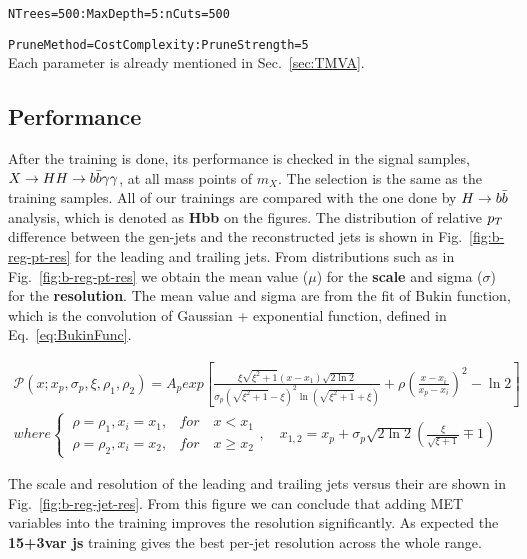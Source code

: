 \verb|NTrees=500:MaxDepth=5:nCuts=500|

\verb|PruneMethod=CostComplexity:PruneStrength=5|\\
Each parameter is already mentioned in Sec.~\ref{sec:TMVA}.

\subsection{Performance}

After the training is done, its performance is checked in the signal samples, $X\to HH\to b\bar{b}\gamma\gamma$, at all mass points of $m_X$.  
The selection is the same as the training samples. 
All of our trainings are compared with the one done by $H\to b\bar{b}$ analysis, which is denoted as \textbf{Hbb} on the figures.
The distribution of relative $p_{T}$ difference between the gen-jets and the reconstructed jets is shown in Fig.~\ref{fig:b-reg-pt-res} for the leading and trailing jets.
From distributions such as in Fig.~\ref{fig:b-reg-pt-res} we obtain the mean value ($\mu$) for the \textbf{scale} and sigma ($\sigma$) for the \textbf{resolution}.
The mean value and sigma are from the fit of Bukin function, which is the convolution of Gaussian + exponential function, defined in Eq.~\ref{eq:BukinFunc}.
\begin{small}
\begin{equation} \label{eq:BukinFunc}
  \begin{aligned}
	\mathcal{P}(x;x_{p},\sigma_{p},\xi,\rho_{1},\rho_{2}) = A_{p}exp\left[\frac{\xi\sqrt{\xi^{2}+1}(x-x_{1})\sqrt{2\ln2}}{\sigma_{p}(\sqrt{\xi^{2}+1}-\xi)^{2}\ln(\sqrt{\xi^{2}+1}+\xi)}+\rho(\frac{x-x_{i}}{x_{p}-x_{i}})^{2}-\ln2\right]
	 \\ where \begin{cases}
		\ \rho=\rho_{1}, x_{i}=x_{1}, & for\quad x < x_{1} \\
		\ \rho=\rho_{2}, x_{i}=x_{2}, & for\quad x \geq x_{2}
		\end{cases}
	, \quad x_{1,2} = x_{p}+\sigma_{p}\sqrt{2\ln2}\left(\frac{\xi}{\sqrt{\xi+1}}\mp1\right)
  \end{aligned}
\end{equation}
\end{small}
The scale and resolution of the leading and trailing jets versus their \PT are shown in Fig.~\ref{fig:b-reg-jet-res}.
From this figure we can conclude that adding MET variables into the training improves the resolution significantly.
As expected the \textbf{15+3var js} training gives the best per-jet resolution across the whole \PT range.

